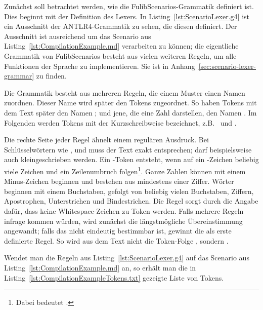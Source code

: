 Zunächst soll betrachtet werden, wie die FulibScenarios-Grammatik definiert ist.
Dies beginnt mit der Definition des Lexers.
In Listing~\ref{lst:ScenarioLexer.g4} ist ein Ausschnitt der ANTLR4-Grammatik zu sehen, die diesen definiert.
Der Ausschnitt ist ausreichend um das Scenario aus Listing~\ref{lst:CompilationExample.md} verarbeiten zu können;
die eigentliche Grammatik von FulibScenarios besteht aus vielen weiteren Regeln, um alle Funktionen der Sprache zu implementieren.
Sie ist in Anhang~\ref{sec:scenario-lexer-grammar} zu finden.


Die Grammatik besteht aus mehreren Regeln, die einem Muster einen Namen zuordnen.
Dieser Name wird später den Tokens zugeordnet.
So haben Tokens mit dem Text  später den Namen ;
und jene, die eine Zahl darstellen, den Namen .
Im Folgenden werden Tokens mit der Kurzschreibweise  bezeichnet,
z.B.\  und .

Die rechte Seite jeder Regel ähnelt einem regulären Ausdruck.
Bei Schlüsselwörtern wie ,  und  muss der Text exakt entsprechen;
 darf beispielsweise auch kleingeschrieben werden.
Ein -Token entsteht, wenn auf ein \code{#}-Zeichen beliebig viele Zeichen und ein Zeilenumbruch folgen\footnote{
    Dabei bedeutet  .
}.
Ganze Zahlen können mit einem Minus-Zeichen beginnen und bestehen aus mindestens einer Ziffer.
Wörter beginnen mit einem Buchstaben, gefolgt von beliebig vielen Buchstaben, Ziffern, Apostrophen, Unterstrichen und Bindestrichen.
Die Regel  sorgt durch die Angabe  dafür, dass keine Whitespace-Zeichen zu Token werden.
Falls mehrere Regeln infrage kommen würden, wird zunächst die längstmögliche Übereinstimmung angewandt;
falls das nicht eindeutig bestimmbar ist, gewinnt die als erste definierte Regel.
So wird aus dem Text  nicht die Token-Folge , sondern .

Wendet man die Regeln aus Listing~\ref{lst:ScenarioLexer.g4} auf das Scenario aus Listing~\ref{lst:CompilationExample.md} an,
so erhält man die in Listing~\ref{lst:CompilationExampleTokens.txt} gezeigte Liste von Tokens.


